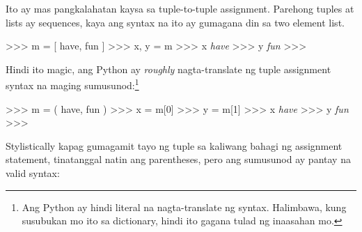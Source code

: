 \documentclass[10pt,]{book}
\newenvironment{Shaded}{}{}
\newcommand{\CommentTok}[1]{\textcolor[rgb]{0.38,0.63,0.69}{\textit{#1}}}
\newcommand{\DecValTok}[1]{\textcolor[rgb]{0.25,0.63,0.44}{#1}}
\newcommand{\NormalTok}[1]{#1}
\newcommand{\OperatorTok}[1]{\textcolor[rgb]{0.40,0.40,0.40}{#1}}
\newcommand{\StringTok}[1]{\textcolor[rgb]{0.25,0.44,0.63}{#1}}
\begin{document}
Ito ay mas pangkalahatan kaysa sa tuple-to-tuple assignment. Parehong
tuples at lists ay sequences, kaya ang syntax na ito ay gumagana din sa
two element list.

\begin{Shaded}
\begin{Highlighting}[]
\OperatorTok{\textgreater{}\textgreater{}\textgreater{}}\NormalTok{ m }\OperatorTok{=}\NormalTok{ [ }\StringTok{\textquotesingle{}have\textquotesingle{}}\NormalTok{, }\StringTok{\textquotesingle{}fun\textquotesingle{}}\NormalTok{ ]}
\OperatorTok{\textgreater{}\textgreater{}\textgreater{}}\NormalTok{ x, y }\OperatorTok{=}\NormalTok{ m}
\OperatorTok{\textgreater{}\textgreater{}\textgreater{}}\NormalTok{ x}
\CommentTok{\textquotesingle{}have\textquotesingle{}}
\OperatorTok{\textgreater{}\textgreater{}\textgreater{}}\NormalTok{ y}
\CommentTok{\textquotesingle{}fun\textquotesingle{}}
\OperatorTok{\textgreater{}\textgreater{}\textgreater{}}
\end{Highlighting}
\end{Shaded}

Hindi ito magic, ang Python ay \emph{roughly} nagta-translate ng tuple
assignment syntax na maging sumusunod:\footnote{Ang Python ay hindi
  literal na nagta-translate ng syntax. Halimbawa, kung susubukan mo ito
  sa dictionary, hindi ito gagana tulad ng inaasahan mo.}

\begin{Shaded}
\begin{Highlighting}[]
\OperatorTok{\textgreater{}\textgreater{}\textgreater{}}\NormalTok{ m }\OperatorTok{=}\NormalTok{ ( }\StringTok{\textquotesingle{}have\textquotesingle{}}\NormalTok{, }\StringTok{\textquotesingle{}fun\textquotesingle{}}\NormalTok{ )}
\OperatorTok{\textgreater{}\textgreater{}\textgreater{}}\NormalTok{ x }\OperatorTok{=}\NormalTok{ m[}\DecValTok{0}\NormalTok{]}
\OperatorTok{\textgreater{}\textgreater{}\textgreater{}}\NormalTok{ y }\OperatorTok{=}\NormalTok{ m[}\DecValTok{1}\NormalTok{]}
\OperatorTok{\textgreater{}\textgreater{}\textgreater{}}\NormalTok{ x}
\CommentTok{\textquotesingle{}have\textquotesingle{}}
\OperatorTok{\textgreater{}\textgreater{}\textgreater{}}\NormalTok{ y}
\CommentTok{\textquotesingle{}fun\textquotesingle{}}
\OperatorTok{\textgreater{}\textgreater{}\textgreater{}}
\end{Highlighting}
\end{Shaded}

Stylistically kapag gumagamit tayo ng tuple sa kaliwang bahagi ng
assignment statement, tinatanggal natin ang parentheses, pero ang
sumusunod ay pantay na valid syntax:
\end{document}
